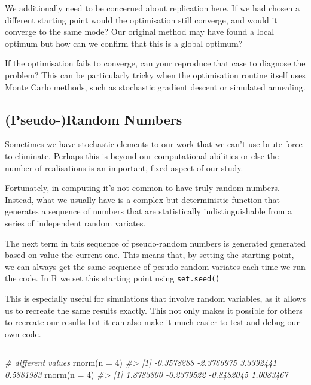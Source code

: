 \documentclass[
  12pt,
]{book}
\newenvironment{Shaded}{\begin{snugshade}}{\end{snugshade}}
\newcommand{\AttributeTok}[1]{\textcolor[rgb]{0.77,0.63,0.00}{#1}}
\newcommand{\CommentTok}[1]{\textcolor[rgb]{0.56,0.35,0.01}{\textit{#1}}}
\newcommand{\DecValTok}[1]{\textcolor[rgb]{0.00,0.00,0.81}{#1}}
\newcommand{\FunctionTok}[1]{\textcolor[rgb]{0.00,0.00,0.00}{#1}}
\newcommand{\NormalTok}[1]{#1}
\begin{document}
We additionally need to be concerned about replication here. If we had chosen a different starting point would the optimisation still converge, and would it converge to the same mode? Our original method may have found a local optimum but how can we confirm that this is a global optimum?

If the optimisation fails to converge, can your reproduce that case to diagnose the problem? This can be particularly tricky when the optimisation routine itself uses Monte Carlo methods, such as stochastic gradient descent or simulated annealing.

\hypertarget{pseudo-random-numbers}{%
\subsection{(Pseudo-)Random Numbers}\label{pseudo-random-numbers}}

Sometimes we have stochastic elements to our work that we can't use brute force to eliminate. Perhaps this is beyond our computational abilities or else the number of realisations is an important, fixed aspect of our study.

Fortunately, in computing it's not common to have truly random numbers. Instead, what we usually have is a complex but deterministic function that generates a sequence of numbers that are statistically indistinguishable from a series of independent random variates.

The next term in this sequence of pseudo-random numbers is generated generated based on value the current one. This means that, by setting the starting point, we can always get the same sequence of pesudo-random variates each time we run the code. In R we set this starting point using \texttt{set.seed()}

This is especially useful for simulations that involve random variables, as it allows us to recreate the same results exactly. This not only makes it possible for others to recreate our results but it can also make it much easier to test and debug our own code.

\begin{center}\rule{0.5\linewidth}{0.5pt}\end{center}

\begin{Shaded}
\begin{Highlighting}[]
\CommentTok{\# different values}
\FunctionTok{rnorm}\NormalTok{(}\AttributeTok{n =} \DecValTok{4}\NormalTok{)}
\CommentTok{\#\textgreater{} [1] {-}0.3578288 {-}2.3766975  3.3392441  0.5881983}
\FunctionTok{rnorm}\NormalTok{(}\AttributeTok{n =} \DecValTok{4}\NormalTok{)}
\CommentTok{\#\textgreater{} [1]  1.8783800 {-}0.2379522 {-}0.8482045  1.0083467}
\end{Highlighting}
\end{Shaded}
\end{document}
